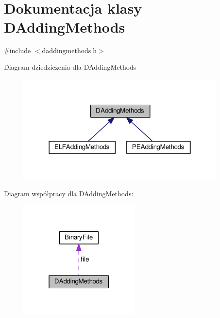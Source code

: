 \hypertarget{class_d_adding_methods}{\section{Dokumentacja klasy D\-Adding\-Methods}
\label{class_d_adding_methods}
}


{\ttfamily \#include $<$daddingmethods.\-h$>$}



Diagram dziedziczenia dla D\-Adding\-Methods
\nopagebreak
\begin{figure}[H]
\begin{center}
\leavevmode
\includegraphics[width=298pt]{class_d_adding_methods__inherit__graph}
\end{center}
\end{figure}


Diagram współpracy dla D\-Adding\-Methods\-:
\nopagebreak
\begin{figure}[H]
\begin{center}
\leavevmode
\includegraphics[width=172pt]{class_d_adding_methods__coll__graph}
\end{center}
\end{figure}
